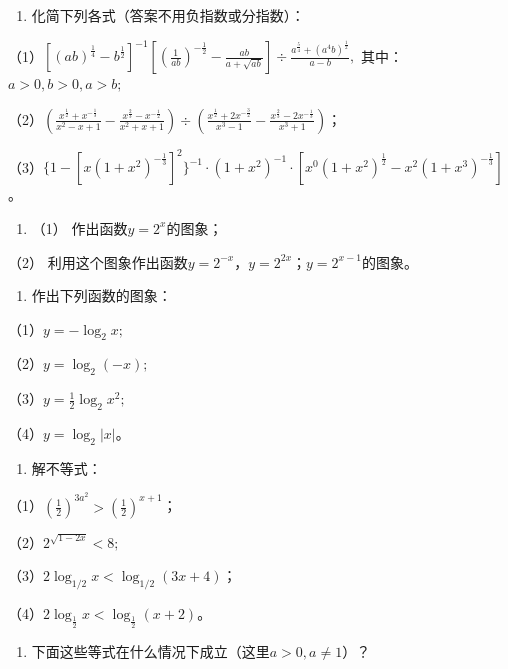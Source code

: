 \begin{enumerate}[start=20]
\item
  化简下列各式（答案不用负指数或分指数）：
\end{enumerate}

（1）\(\left[(ab)^{\frac{1}{4}} - b^{\frac{1}{2}}\right]^{-1}\left[\left(\frac{1}{ab}\right)^{-\frac{1}{2}} - \frac{ab}{a + \sqrt{ab}}\right] \div \frac{a^{\frac{5}{4}} + (a^4b)^{\frac{1}{2}}}{a - b},\)
其中：\(a > 0, b > 0, a > b;\)

（2）\(\left(\frac{x^{\frac{1}{2}} + x^{-\frac{1}{3}}}{x^{2} - x + 1} - \frac{x^{\frac{2}{3}} - x^{-\frac{1}{2}}}{x^{2} + x + 1}\right) \div \left(\frac{x^{\frac{1}{2}} + 2x^{-\frac{3}{2}}}{x^{3} - 1} - \frac{x^{\frac{2}{3}} - 2x^{-\frac{1}{3}}}{x^{3} + 1}\right)\)；

（3）\(\{1 - [x(1 + x^2)^{-\frac{1}{3}}]^2\}^{-1} \cdot (1 + x^2)^{-1} \cdot [x^0(1 + x^2)^{\frac{1}{2}} - x^2(1 + x^3)^{-\frac{1}{3}}]\)。

\begin{enumerate}[start=21]
\item
  （1） 作出函数\(y = 2^x\)的图象；
\end{enumerate}

（2）
利用这个图象作出函数\(y = 2^{-x}\)，\(y = 2^{2x}\)；\(y = 2^{x-1}\)的图象。

\begin{enumerate}[start=22]
\item
  作出下列函数的图象：
\end{enumerate}

（1）\(y = -\log_2 x;\)

（2）\(y = \log_2(-x);\)

（3）\(y = \frac{1}{2} \log_2 x^2;\)

（4）\(y = \log_2 |x|\)。

\begin{enumerate}[start=23]
\item
  解不等式：
\end{enumerate}

（1）\(\left(\frac{1}{2}\right)^{3a^2} > \left(\frac{1}{2}\right)^{x + 1}\)；

（2）\(2^{\sqrt{1-2x}}<8;\)

（3）\(2\log_{1/2}x < \log_{1/2}(3x + 4)\)；

（4）\(2\log_{\frac{1}{2}}x < \log_{\frac{1}{2}}(x + 2)\)。

\begin{enumerate}[start=24]
\item
  下面这些等式在什么情况下成立（这里\(a > 0, a \neq 1\)）？
\end{enumerate}

